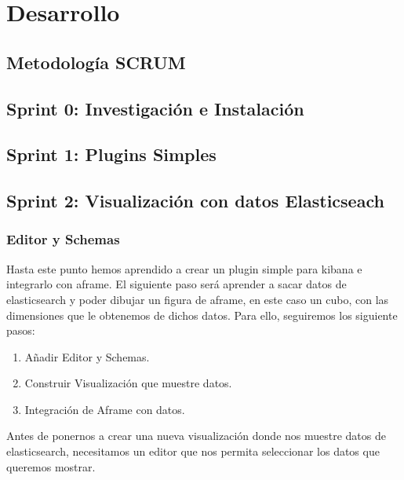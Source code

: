 \documentclass[a4paper, 12pt]{book}
\begin{document}
\cleardoublepage
\chapter{Desarrollo}
\label{sec:desarrollo} 


\section{Metodolog\'ia SCRUM}
\label{sec:scrum}


\section{Sprint 0: Investigación e Instalación }
\label{sec:sprint0}


\section{Sprint 1: Plugins Simples }
\label{sec:sprint1}


\section{Sprint 2: Visualización con datos Elasticseach }
\label{sec:sprint2}
\subsection{Editor y Schemas}
Hasta este punto hemos aprendido a crear un plugin simple para kibana e integrarlo con aframe. El siguiente paso será aprender a sacar datos de elasticsearch y poder dibujar un figura de aframe, en este caso un cubo, con las dimensiones que le obtenemos de dichos datos. Para ello, seguiremos los siguiente pasos:
\begin{enumerate}
    \item Añadir Editor y Schemas.
    \item Construir Visualización que muestre datos.
    \item Integración de Aframe con datos.
\end{enumerate}

Antes de ponernos a crear una nueva visualización donde nos muestre datos de elasticsearch, necesitamos un editor que nos permita seleccionar los datos que queremos mostrar. 
\end{document}
